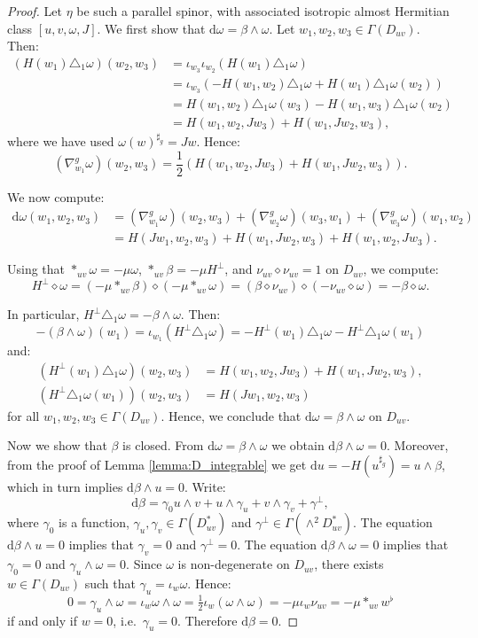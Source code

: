 \documentclass[10pt,a4paper,twoside,reqno]{amsart}
\theoremstyle{plain}
\theoremstyle{definition}
\theoremstyle{remark}
\def\dd{\mathrm{d}}
\def\dd{\mathrm{d}}
\begin{document}
\begin{proof}
Let $\eta$ be such a parallel spinor, with associated isotropic almost Hermitian class $[u,v,\omega,J]$. We first show that $\dd\omega=\beta\wedge\omega$. Let $w_1,w_2,w_3\in\Gamma(D_{uv})$. Then: \begin{align*}
        (H(w_1)\triangle_1\omega)(w_2,w_3)&=\iota_{w_3}\iota_{w_2}(H(w_1)\triangle_1\omega)\\
        &=\iota_{w_3}(-H(w_1,w_2)\triangle_1\omega+H(w_1)\triangle_1\omega(w_2))\\
        &=H(w_1,w_2)\triangle_1\omega(w_3)-H(w_1,w_3)\triangle_1\omega(w_2)\\
        &=H(w_1,w_2,Jw_3)+H(w_1,Jw_2,w_3),
    \end{align*} where we have used $\omega(w)^{\sharp_g}=Jw$. Hence: $$(\nabla^g_{w_1}\omega)(w_2,w_3)=\frac{1}{2}(H(w_1,w_2,Jw_3)+H(w_1,Jw_2,w_3)).$$
    
    We now compute: \begin{align*}
        \dd\omega(w_1,w_2,w_3)&=(\nabla^g_{w_1}\omega)(w_2,w_3)+(\nabla^g_{w_2}\omega)(w_3,w_1)+(\nabla^g_{w_3}\omega)(w_1,w_2)\\
        &=H(Jw_1,w_2,w_3)+H(w_1,Jw_2,w_3)+H(w_1,w_2,Jw_3).
    \end{align*}
    
    Using that $*_{uv}\omega=-\mu\omega$, $*_{uv}\beta=-\mu H^\perp$, and $\nu_{uv}\diamond\nu_{uv}=1$ on $D_{uv}$, we compute: $$H^\perp\diamond\omega=(-\mu*_{uv}\beta)\diamond(-\mu*_{uv}\omega)=(\beta\diamond\nu_{uv})\diamond(-\nu_{uv}\diamond\omega)=-\beta\diamond\omega.$$
    
    In particular, $H^\perp\triangle_1\omega=-\beta\wedge\omega$. Then: $$-(\beta\wedge\omega)(w_1)=\iota_{w_1} (H^\perp\triangle_1\omega)=-H^\perp(w_1)\triangle_1\omega-H^\perp\triangle_1\omega(w_1)$$ and: \begin{align*}
        (H^\perp(w_1)\triangle_1\omega)(w_2,w_3)&=H(w_1,w_2,Jw_3)+H(w_1,Jw_2,w_3),\\
        (H^\perp\triangle_1\omega(w_1))(w_2,w_3)&=H(Jw_1,w_2,w_3)
    \end{align*} for all $w_1,w_2,w_3\in\Gamma(D_{uv})$. Hence, we conclude that $\dd\omega=\beta\wedge\omega$ on $D_{uv}$.\medskip

    Now we show that $\beta$ is closed. From $\dd\omega=\beta\wedge\omega$ we obtain $\dd\beta\wedge\omega=0$. Moreover, from the proof of Lemma \ref{lemma:D_integrable} we get $\dd u=-H(u^{\sharp_g})=u\wedge\beta$, which in turn implies $\dd\beta\wedge u=0$. Write: $$\dd\beta=\gamma_0u\wedge v+u\wedge\gamma_u+v\wedge\gamma_v+\gamma^\perp,$$ where $\gamma_0$ is a function, $\gamma_u,\gamma_v\in\Gamma(D_{uv}^*)$ and $\gamma^\perp\in\Gamma(\wedge^2D_{uv}^*)$. The equation $\dd\beta\wedge u=0$ implies that $\gamma_v=0$ and $\gamma^\perp=0$. The equation $\dd\beta\wedge\omega=0$ implies that $\gamma_0=0$ and $\gamma_u\wedge\omega=0$. Since $\omega$ is non-degenerate on $D_{uv}$, there exists $w\in\Gamma(D_{uv})$ such that $\gamma_u=\iota_w\omega$. Hence: $$0=\gamma_u\wedge\omega=\iota_w\omega\wedge\omega=\tfrac{1}{2}\iota_w(\omega\wedge\omega)=-\mu\iota_w\nu_{uv}=-\mu*_{uv}w^\flat$$ if and only if $w=0$, i.e.\ $\gamma_u=0$. Therefore $\dd\beta=0$.\medskip


\end{proof}
\end{document}
